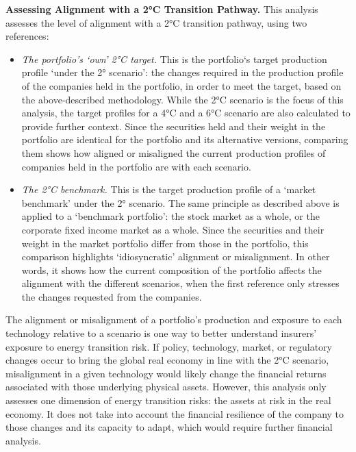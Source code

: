 \documentclass[10pt,table,a4]{article}\usepackage[]{graphicx}\usepackage[]{color}
\begin{document}
	\begin{multicols}{2}
		
		
		\textbf{Assessing Alignment with a 2°C Transition Pathway. }This analysis assesses the level of alignment with a 2°C transition 	pathway, using two references:
		
		\begin{itemize}
			\item{\textit{The portfolio's ‘own’ 2°C target.} This is the portfolio‘s target production profile ‘under the 2° scenario’: the 	changes required in the production profile of the companies held in the portfolio, in order to meet the target, based on the above-described methodology. While the 2°C scenario is the focus of this analysis, the target profiles for a 4°C and a 6°C scenario are also calculated to provide further context. Since the securities held and their weight in the portfolio are identical for the portfolio and its alternative versions, comparing them shows how aligned or misaligned the current production profiles of companies held in the portfolio are with each scenario.}
			
			\item{\textit{The 2°C benchmark. }This is the target production profile of a ‘market benchmark’ under the 2° scenario. The same 	principle as described above is applied to a ‘benchmark portfolio’: the stock market as a whole, or the corporate fixed income market as a whole. Since the securities and their weight in the market portfolio differ from those in the portfolio, this comparison highlights ‘idiosyncratic’ alignment or misalignment. In other words, it shows how the current composition of the portfolio affects the alignment with the different scenarios, when the first reference only stresses the changes requested from the companies.}
		\end{itemize}
		
		
		The alignment or misalignment of a portfolio’s production and exposure to each technology relative to a scenario is one way to better understand insurers’ exposure to energy transition risk. If policy, technology, market, or regulatory changes occur to bring the global real economy in line with the 2°C scenario, misalignment in a given technology would likely change the financial returns associated with those underlying physical assets. However, this analysis only assesses one dimension of energy transition risks: the assets at risk in the real economy. It does not take into account the financial resilience of the company to those changes and its capacity to adapt, which would require further financial analysis.
		

\end{multicols}
\end{document}
